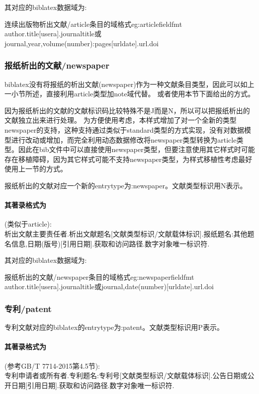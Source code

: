 其对应的biblatex数据域为:
\begin{codetex}{连续出版物析出文献/article条目的域格式}{eg:articlefieldfmt}
author.title[usera].journaltitle或journal,year,volume(number):pages[urldate].url.doi
\end{codetex}


\subsubsection{报纸析出的文献/newspaper}\label{sec:standard}
biblatex没有将报纸的析出文献(newspaper)作为一种文献条目类型，因此可以如上一小节所述，直接利用article类型加note域代替。
或者使用本节下面给出的方式。

因为报纸析出的文献的文献标识码比较特殊不是J而是N，所以可以把报纸析出的文献独立出来进行处理。
为方便使用考虑，本样式增加了对一个全新的类型newspaper的支持，这种支持通过类似于standard类型的方式实现，没有对数据模型进行改动或增加，而完全利用动态数据修改将newspaper类型转换为article类型。因此在bib文件中可以直接使用newspaper类型，但要注意使用其它样式时可能存在移植障碍，因为其它样式可能不支持newspaper类型，为样式移植性考虑最好使用上一节的方式。

\begin{refentry}{}{}
报纸析出的文献对应一个新的entrytype为:newspaper。文献类型标识用N表示。

\paragraph{其著录格式为}(类似于article):\\
析出文献主要责任者.析出文献题名[文献类型标识/文献载体标识].报纸题名:其他题名信息,日期(版号)[引用日期].获取和访问路径.数字对象唯一标识符.
\end{refentry}

其对应的biblatex数据域为:
\begin{codetex}{报纸析出的文献/newspaper条目的域格式}{eg:newspaperfieldfmt}
author.title[usera].journaltitle或journal,date(number)[urldate].url.doi
\end{codetex}

\subsubsection{专利/patent}
\begin{refentry}{}{}%
专利文献对应的biblatex的entrytype为:patent。文献类型标识用P表示。

\paragraph{其著录格式为}(参考GB/T 7714-2015第4.5节):\\
专利申请者或所有者.专利题名:专利号[文献类型标识/文献载体标识].公告日期或公开日期[引用日期].获取和访问路径.数字对象唯一标识符.
\end{refentry}

